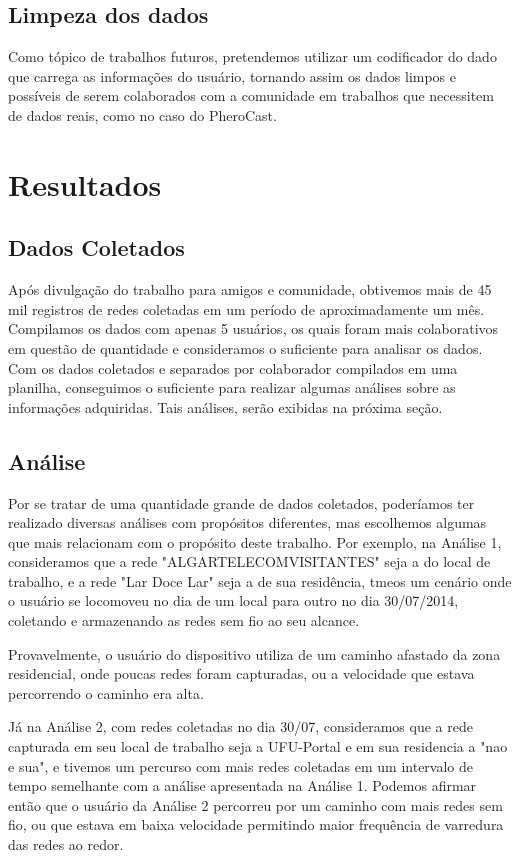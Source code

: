 \documentclass[12pt, %
openright, 
oneside,
a4paper,
brazil]{facom-ufu-abntex2}
\begin{document}
\section{Limpeza dos dados}
Como tópico de trabalhos futuros, pretendemos utilizar um codificador do dado que carrega as informações do usuário, tornando assim os dados limpos e possíveis de serem colaborados com a comunidade em trabalhos que necessitem de dados reais, como no caso do PheroCast.


\chapter{Resultados}
\section{Dados Coletados}
Após divulgação do trabalho para amigos e comunidade, obtivemos mais de 45 mil registros de redes coletadas em um período de aproximadamente um mês. Compilamos os dados com apenas 5 usuários, os quais foram mais colaborativos em questão de quantidade e consideramos o suficiente para analisar os dados.
Com os dados coletados e separados por colaborador compilados em uma planilha, conseguimos o suficiente para realizar algumas análises sobre as informações adquiridas. Tais análises, serão exibidas na próxima seção.

\section{Análise}
Por se tratar de uma quantidade grande de dados coletados, poderíamos ter realizado diversas análises com propósitos diferentes, mas escolhemos algumas que mais relacionam com o propósito deste trabalho. Por exemplo, na Análise 1, consideramos que a rede "ALGARTELECOMVISITANTES"  seja a do local de trabalho, e a rede "Lar Doce Lar" seja a de sua residência, tmeos um cenário onde o usuário se locomoveu no dia  de um local para outro no dia 30/07/2014, coletando e armazenando as redes sem fio ao seu alcance.


 Provavelmente, o usuário do dispositivo utiliza de um caminho afastado da zona residencial, onde poucas redes foram capturadas, ou a velocidade que estava percorrendo o caminho era alta.
 
 Já na Análise 2, com redes coletadas no dia 30/07, consideramos que a rede capturada em seu local de trabalho seja a UFU-Portal e em sua residencia a "nao e sua", e tivemos um percurso com mais redes coletadas em um intervalo de tempo semelhante com a análise apresentada na Análise 1. Podemos afirmar então que o usuário da Análise 2 percorreu por um caminho com mais redes sem fio, ou que estava em baixa velocidade permitindo maior frequência de varredura das redes ao redor.
\end{document}
